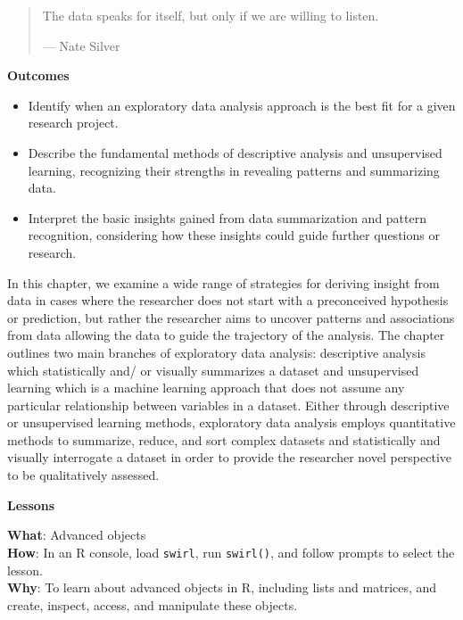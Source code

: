 \documentclass[
  letterpaper,
]{latex/krantz}
\providecommand{\tightlist}{%
  \setlength{\itemsep}{0pt}\setlength{\parskip}{0pt}}\usepackage{longtable,booktabs,array}
\theoremstyle{definition}
\theoremstyle{remark}
\begin{document}
\begin{quote}
The data speaks for itself, but only if we are willing to listen.

--- Nate Silver
\end{quote}

\begin{tcolorbox}[enhanced jigsaw, colframe=quarto-callout-color-frame, breakable, bottomrule=.15mm, arc=.35mm, left=2mm, opacityback=0, rightrule=.15mm, colback=white, toprule=.15mm, leftrule=.75mm]

\textbf{ Outcomes}

\begin{itemize}
\tightlist
\item
  Identify when an exploratory data analysis approach is the best fit
  for a given research project.
\item
  Describe the fundamental methods of descriptive analysis and
  unsupervised learning, recognizing their strengths in revealing
  patterns and summarizing data.
\item
  Interpret the basic insights gained from data summarization and
  pattern recognition, considering how these insights could guide
  further questions or research.
\end{itemize}

\end{tcolorbox}

In this chapter, we examine a wide range of strategies for deriving
insight from data in cases where the researcher does not start with a
preconceived hypothesis or prediction, but rather the researcher aims to
uncover patterns and associations from data allowing the data to guide
the trajectory of the analysis. The chapter outlines two main branches
of exploratory data analysis: descriptive analysis which statistically
and/ or visually summarizes a dataset and unsupervised learning which is
a machine learning approach that does not assume any particular
relationship between variables in a dataset. Either through descriptive
or unsupervised learning methods, exploratory data analysis employs
quantitative methods to summarize, reduce, and sort complex datasets and
statistically and visually interrogate a dataset in order to provide the
researcher novel perspective to be qualitatively assessed.

\begin{tcolorbox}[enhanced jigsaw, colframe=quarto-callout-color-frame, breakable, bottomrule=.15mm, arc=.35mm, left=2mm, opacityback=0, rightrule=.15mm, colback=white, toprule=.15mm, leftrule=.75mm]

\textbf{ Lessons}

\textbf{What}: Advanced objects\\
\textbf{How}: In an R console, load \texttt{swirl}, run
\texttt{swirl()}, and follow prompts to select the lesson.\\
\textbf{Why}: To learn about advanced objects in R, including lists and
matrices, and create, inspect, access, and manipulate these objects.

\end{tcolorbox}
\end{document}
